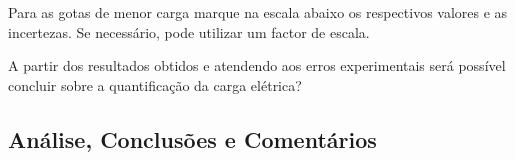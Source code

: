 \documentclass[a4paper,12pt]{article}  %
\begin{document}
\vspace{2cm}
Para as gotas de menor carga marque na escala abaixo os respectivos valores e as incertezas. Se necessário, pode utilizar um factor de escala. 
\begin{center}
  \sansmath
\end{center}

 A partir dos resultados obtidos e atendendo
aos erros experimentais será possível concluir sobre a quantificação da carga elétrica?


\subsection{\sf Análise, Conclusões e Comentários}
\noindent\underline{\makebox[\textwidth][r]{~}} \\
\noindent\underline{\makebox[\textwidth][r]{~}} \\
\noindent\underline{\makebox[\textwidth][r]{~}} \\
\noindent\underline{\makebox[\textwidth][r]{~}} \\
\noindent\underline{\makebox[\textwidth][r]{~}} \\
\noindent\underline{\makebox[\textwidth][r]{~}} \\
\noindent\underline{\makebox[\textwidth][r]{~}} \\
\noindent\underline{\makebox[\textwidth][r]{~}} \\
\noindent\underline{\makebox[\textwidth][r]{~}} \\
\noindent\underline{\makebox[\textwidth][r]{~}} \\
\noindent\underline{\makebox[\textwidth][r]{~}} \\
\noindent\underline{\makebox[\textwidth][r]{~}} \\
\noindent\underline{\makebox[\textwidth][r]{~}} \\
\noindent\underline{\makebox[\textwidth][r]{~}} \\
\noindent\underline{\makebox[\textwidth][r]{~}} \\




\end{document}
